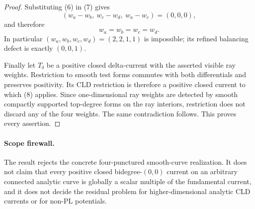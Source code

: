 \begin{proof}
Substituting (6) in (7) gives
\[
 (w_a-w_b,\ w_c-w_d,\ w_a-w_c)=(0,0,0),
\]
and therefore
\[
                         w_a=w_b=w_c=w_d.
\tag{8}
\]
In particular $(w_a,w_b,w_c,w_d)=(2,2,1,1)$ is impossible; its refined
balancing defect is exactly $(0,0,1)$.

Finally let $T_\delta$ be a positive closed delta-current with the asserted
visible ray weights.  Restriction to smooth test forms commutes with both
differentials and preserves positivity.  Its CLD restriction is therefore
a positive closed current to which (8) applies.  Since one-dimensional ray
weights are detected by smooth compactly supported top-degree forms on the
ray interiors, restriction does not discard any of the four weights.  The
same contradiction follows.  This proves every assertion.
\end{proof}

\paragraph{Scope firewall.}
The result rejects the concrete four-punctured smooth-curve realization.
It does not claim that every positive closed bidegree-$(0,0)$ current on an
arbitrary connected analytic curve is globally a scalar multiple of the
fundamental current, and it does not decide the residual problem for
higher-dimensional analytic CLD currents or for non-PL potentials.
